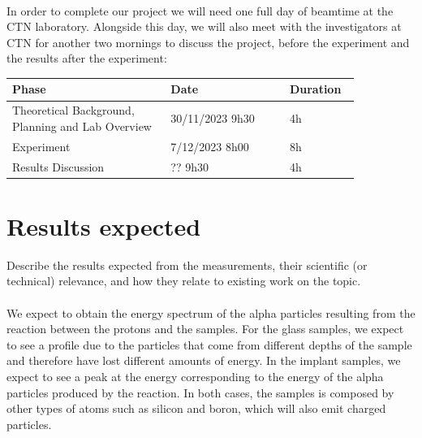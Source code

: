 \documentclass{article}
\begin{document}
\begin{multicols}{2}
\paragraph*{}

In order to complete our project we will need one full day of beamtime at the CTN laboratory. Alongside this day, we will
also meet with the investigators at CTN for another two mornings to discuss the project, before the experiment and the
results after the experiment:

\begin{table}[H]
\centering
\begin{tabular}{|w{0.4\linewidth}|w{0.3\linewidth}|w{0.15\linewidth}|}
\hline
Phase & Date & Duration \\ \hline
Theoretical Background, Planning and Lab Overview & 30/11/2023 9h30 & 4h \\ \hline
Experiment & 7/12/2023 8h00 & 8h \\ \hline
Results Discussion & ?? 9h30 & 4h \\ \hline
\end{tabular}
\end{table}

\section{Results expected}

Describe the results expected from the measurements, their scientific (or technical) relevance, and how they relate to
existing work on the topic.

\paragraph{}

We expect to obtain the energy spectrum of the alpha particles resulting from the reaction between the protons and the
samples. 
For the glass samples, we expect to see a profile due to the particles that come from different depths of the sample and
therefore have lost different amounts of energy. In the implant samples, we expect to see a peak at the energy corresponding
to the energy of the alpha particles produced by the reaction.
In both cases, the samples is composed by other types of atoms such as silicon and boron, which will also emit charged
particles.

\paragraph{}


\end{multicols}
\end{document}
